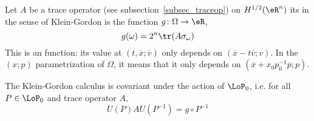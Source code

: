 Let $A$ be a trace operator (see subsection~\ref{subsec_traceop}) on $H^{1/2}(\eR^n)$ its  in the sense of Klein-Gordon is the function $g\colon \Omega\to \eR$,
\begin{equation}
 g(\omega)=2^n\tr(A\sigma_{\omega})\end{equation}
This is an  function: its value at $(t,\overline{x};\overline{v})$ only depends on $(\overline{x}-t\overline{v};v)$. In the $(x;p)$ parametrization of $\Omega$, it means that it only depends on $(\overline{x}+x_0p_0^{-1}\overline{p};p)$.

\begin{proposition}
The Klein-Gordon calculus is covariant under the action of $\LoP_0$, i.e. for all $P\in\LoP_0$ and trace operator $A$,
\[
  U(P)A U(P^{-1})=g\circ P^{-1}
\]

\end{proposition}

